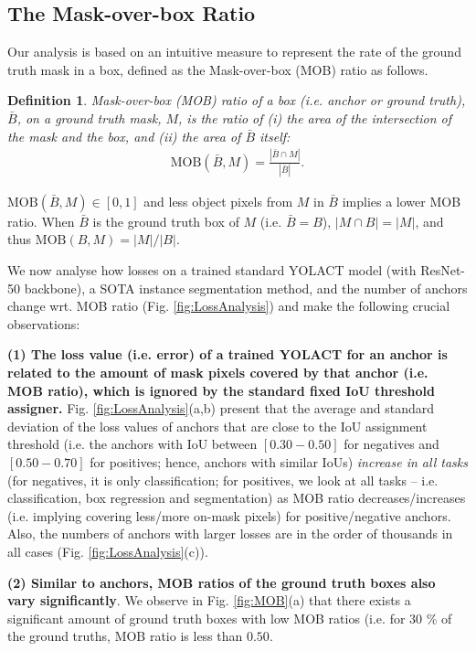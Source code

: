 \documentclass{bmvc2k}
\newtheorem{definition}{Definition}
\begin{document}
\subsection{The Mask-over-box Ratio}
\label{subsec:Analysis}

Our analysis is based on an intuitive measure to represent the rate of the ground truth mask in a box, defined as the Mask-over-box (MOB) ratio as follows.

\begin{definition}
Mask-over-box (MOB) ratio of a box (i.e. anchor or ground truth), $\bar{B}$, on a ground truth mask, $M$, is the ratio of (i) the area of the intersection of the mask and the box, and (ii) the area of $\bar{B}$ itself: \begin{align}
\mathrm{MOB}(\bar{B},M)= \frac{|\bar{B} \cap M|}{|\bar{B}|}.     
\end{align}
\end{definition}

$\mathrm{MOB}(\bar{B},M) \in [0,1]$  and less object pixels from $M$ in $\bar{B}$ implies a lower MOB ratio. When $\bar{B}$ is the ground truth box of $M$ (i.e. $\bar{B}=B$), $|M \cap B|=|M|$, and thus $\mathrm{MOB}(B,M)=|M|/|B|$. 

We now analyse how losses on a trained standard YOLACT model (with ResNet-50 backbone), a SOTA instance segmentation method, and the number of anchors change wrt. MOB ratio (Fig. \ref{fig:LossAnalysis}) and make the following crucial observations:

\noindent \textbf{(1) The loss value (i.e. error) of a trained YOLACT for an anchor is related to the amount of mask pixels covered by that anchor (i.e. MOB ratio), which is ignored by the standard fixed IoU threshold assigner.} Fig. \ref{fig:LossAnalysis}(a,b) present that the average and standard deviation of the loss values of anchors that are close to the IoU assignment threshold (i.e. the anchors with IoU between $[0.30-0.50]$ for negatives and $[0.50-0.70]$ for positives; hence, anchors with similar IoUs) \textit{increase in all tasks} (for negatives, it is only classification; for positives, we look at all tasks -- i.e. classification, box regression and segmentation) as MOB ratio decreases/increases (i.e. implying covering less/more on-mask pixels) for positive/negative anchors. 
Also, the numbers of anchors with larger losses are in the order of thousands in all cases (Fig. \ref{fig:LossAnalysis}(c)). 


\noindent \textbf{(2) Similar to anchors, MOB ratios of the ground truth boxes also vary significantly}. We observe in Fig. \ref{fig:MOB}(a) that there exists a significant amount of ground truth boxes with low MOB ratios (i.e. for 30 \% of the ground truths, MOB ratio is less than $0.50$. 
\end{document}
